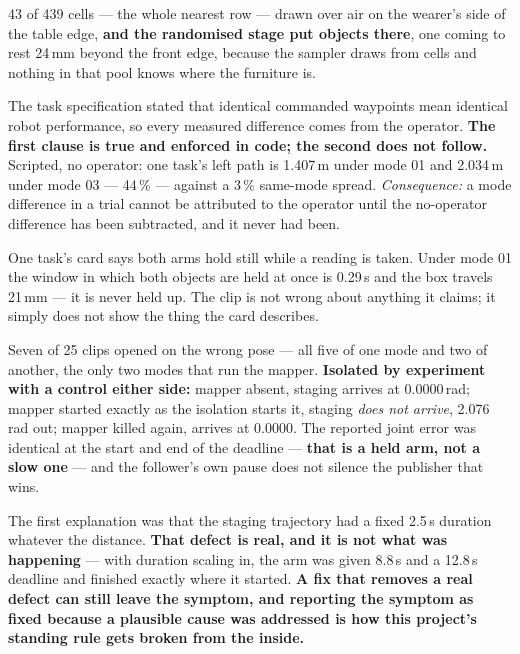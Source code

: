 {43 of 439 cells --- the whole nearest row --- drawn over air on the wearer's
side of the table edge, \textbf{and the randomised stage put objects there},
one coming to rest 24\,mm beyond the front edge, because the sampler draws from
cells and nothing in that pool knows where the furniture is.}

{The task specification stated that identical commanded waypoints mean identical
robot performance, so every measured difference comes from the operator.
\textbf{The first clause is true and enforced in code; the second does not
follow.} Scripted, no operator: one task's left path is 1.407\,m under mode 01
and 2.034\,m under mode 03 --- 44\,\% --- against a 3\,\% same-mode spread.
\textit{Consequence:} a mode difference in a trial cannot be attributed to the
operator until the no-operator difference has been subtracted, and it never had
been.}

{One task's card says both arms hold still while a reading is taken. Under mode
01 the window in which both objects are held at once is 0.29\,s and the box
travels 21\,mm --- it is never held up. The clip is not wrong about anything it
claims; it simply does not show the thing the card describes.}

{Seven of 25 clips opened on the wrong pose --- all five of one mode and two of
another, the only two modes that run the mapper. \textbf{Isolated by experiment
with a control either side:} mapper absent, staging arrives at 0.0000\,rad;
mapper started exactly as the isolation starts it, staging \emph{does not
arrive}, 2.076\,rad out; mapper killed again, arrives at 0.0000. The reported
joint error was identical at the start and end of the deadline --- \textbf{that
is a held arm, not a slow one} --- and the follower's own pause does not silence
the publisher that wins.}

{The first explanation was that the staging trajectory had a fixed 2.5\,s
duration whatever the distance. \textbf{That defect is real, and it is not what
was happening} --- with duration scaling in, the arm was given 8.8\,s and a
12.8\,s deadline and finished exactly where it started. \textbf{A fix that
removes a real defect can still leave the symptom, and reporting the symptom as
fixed because a plausible cause was addressed is how this project's standing
rule gets broken from the inside.}}

